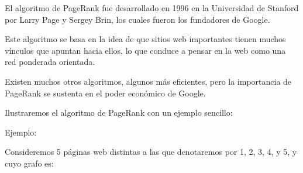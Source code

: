 \documentclass[11pt, spanish]{report}
\begin{document}
El algoritmo de PageRank fue desarrollado en 1996 en la Universidad de Stanford por Larry Page y Sergey Brin, los cuales fueron los fundadores de Google.

Este algoritmo se basa en la idea de que sitios web importantes tienen muchos vínculos que apuntan hacia ellos, lo que conduce a pensar en la web como una red ponderada orientada.

Existen muchos otros algoritmos, algunos más eficientes, pero la importancia de PageRank se sustenta en el poder económico de Google.

Ilustraremos el algoritmo de PageRank con un ejemplo sencillo:

Ejemplo:

Consideremos 5 páginas web distintas a las que denotaremos por 1, 2, 3, 4, y 5, y cuyo grafo es:
\vspace{3cm}
\end{document}
